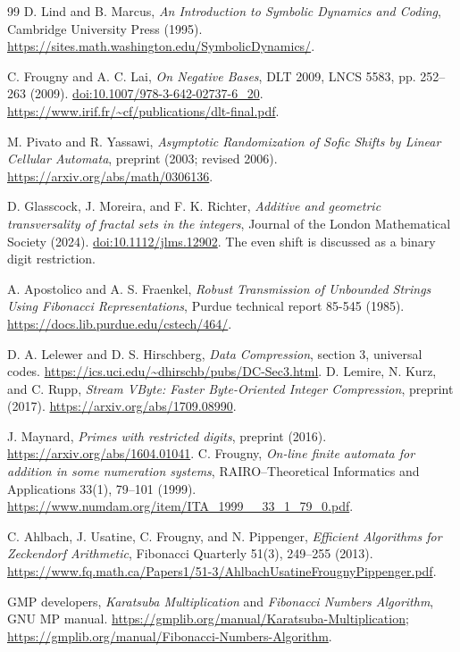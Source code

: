 \documentclass[11pt]{article}
\theoremstyle{definition}\newtheorem{definition}[theorem]{Definition}
\begin{document}
\clearpage
\begin{thebibliography}{99}
D. Lind and B. Marcus,
\emph{An Introduction to Symbolic Dynamics and Coding},
Cambridge University Press (1995).
\url{https://sites.math.washington.edu/SymbolicDynamics/}.

C. Frougny and A. C. Lai, \emph{On Negative Bases},
DLT 2009, LNCS 5583, pp. 252--263 (2009).
\href{https://doi.org/10.1007/978-3-642-02737-6_20}{doi:10.1007/978-3-642-02737-6\_20}.
\url{https://www.irif.fr/~cf/publications/dlt-final.pdf}.

M. Pivato and R. Yassawi,
\emph{Asymptotic Randomization of Sofic Shifts by Linear Cellular Automata},
preprint (2003; revised 2006).
\url{https://arxiv.org/abs/math/0306136}.

D. Glasscock, J. Moreira, and F. K. Richter,
\emph{Additive and geometric transversality of fractal sets in the integers},
Journal of the London Mathematical Society (2024).
\href{https://doi.org/10.1112/jlms.12902}{doi:10.1112/jlms.12902}.
The even shift is discussed as a binary digit restriction.

A. Apostolico and A. S. Fraenkel,
\emph{Robust Transmission of Unbounded Strings Using Fibonacci
Representations}, Purdue technical report 85-545 (1985).
\url{https://docs.lib.purdue.edu/cstech/464/}.

D. A. Lelewer and D. S. Hirschberg,
\emph{Data Compression}, section 3, universal codes.
\url{https://ics.uci.edu/~dhirschb/pubs/DC-Sec3.html}.
D. Lemire, N. Kurz, and C. Rupp,
\emph{Stream VByte: Faster Byte-Oriented Integer Compression},
preprint (2017). \url{https://arxiv.org/abs/1709.08990}.

J. Maynard, \emph{Primes with restricted digits}, preprint (2016).
\url{https://arxiv.org/abs/1604.01041}.
C. Frougny, \emph{On-line finite automata for addition in some numeration
systems}, RAIRO--Theoretical Informatics and Applications 33(1), 79--101
(1999). \url{https://www.numdam.org/item/ITA_1999__33_1_79_0.pdf}.

C. Ahlbach, J. Usatine, C. Frougny, and N. Pippenger,
\emph{Efficient Algorithms for Zeckendorf Arithmetic},
Fibonacci Quarterly 51(3), 249--255 (2013).
\url{https://www.fq.math.ca/Papers1/51-3/AhlbachUsatineFrougnyPippenger.pdf}.

GMP developers, \emph{Karatsuba Multiplication} and
\emph{Fibonacci Numbers Algorithm}, GNU MP manual.
\url{https://gmplib.org/manual/Karatsuba-Multiplication};
\url{https://gmplib.org/manual/Fibonacci-Numbers-Algorithm}.


\end{thebibliography}
\end{document}
